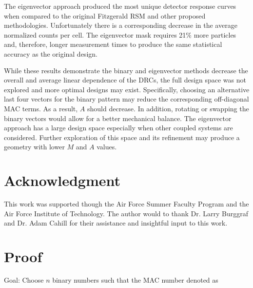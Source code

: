 \documentclass[3p,times]{elsarticle}
\begin{document}
The eigenvector approach produced the most unique detector response curves when compared to the original Fitzgerald RSM and other proposed methodologies. 
Unfortunately there is a corresponding decrease in the average normalized counts per cell.
The eigenvector mask requires 21\% more particles and, therefore, longer measurement times to produce the same statistical accuracy as the original design.

While these results demonstrate the binary and eigenvector methods decrease the overall and average linear dependence of the DRCs, the full design space was not explored and more optimal designs may exist.  
Specifically, choosing an alternative last four vectors for the binary pattern may reduce the corresponding off-diagonal MAC terms.  
As a result, $A$ should decrease.  
In addition, rotating or swapping the binary vectors would allow for a better mechanical balance.  
The eigenvector approach has a large design space especially when other coupled systems are considered.  
Further exploration of this space and its refinement may produce a geometry with lower $M$ and $A$ values.

\section{Acknowledgment}
This work was supported though the Air Force Summer Faculty Program and the Air Force Institute of Technology.  
The author would to thank Dr. Larry Burggraf and Dr. Adam Cahill for their assistance and insightful input to this work.

\appendix

\section{Proof}

Goal: Choose $n$ binary numbers such that the MAC number denoted as 
\end{document}
